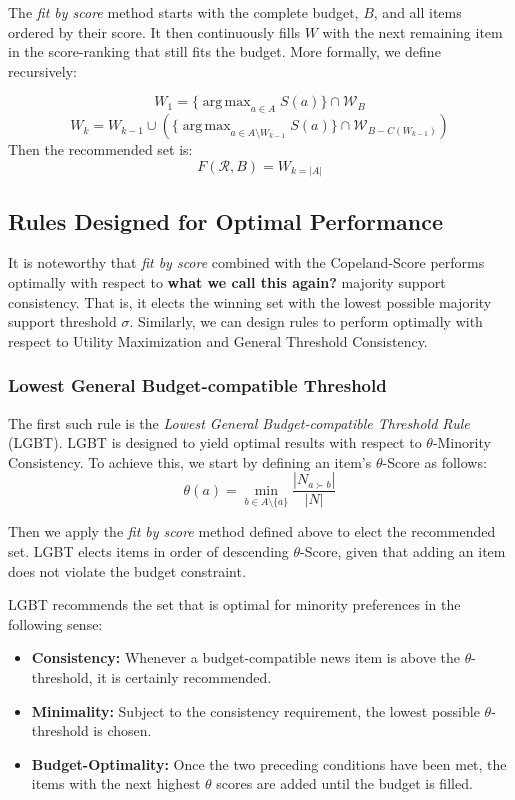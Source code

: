\documentclass{article}
\DeclareMathOperator*{\argmax}{arg\,max}
\begin{document}
The \emph{fit by score} method starts with the complete budget, $B$, and all items ordered by their score. It then continuously fills $W$ with the next remaining item in the score-ranking that still fits the budget. More formally, we define recursively:

\[W_1=\{\argmax_{a\in A}S(a)\}\cap \mathcal{W}_B\]
\[W_k=W_{k-1}\cup (\{\argmax_{a\in A\setminus W_{k-1}}S(a)\}\cap \mathcal{W}_{B-C(W_{k-1})})\]
Then the recommended set is:
\[F(\mathcal{R},B)=W_{k=|A|}\]

\subsection{Rules Designed for Optimal Performance}
It is noteworthy that \emph{fit by score} combined with the Copeland-Score performs optimally with respect to \textbf{what we call this again?} majority support consistency. That is, it elects the winning set with the lowest possible majority support threshold $\sigma$. Similarly, we can design rules to perform optimally with respect to Utility Maximization and General Threshold Consistency.

\subsubsection{Lowest General Budget-compatible Threshold}
The first such rule is the \emph{Lowest General Budget-compatible Threshold Rule} (LGBT). LGBT is designed to yield optimal results with respect to $\theta$-Minority Consistency. To achieve this, we start by defining an item's $\theta$-Score as follows:
\[\theta(a)=\min_{b\in A \setminus {\{a\}}} \frac{|N_{a\succ b}|}{|N|}\]

Then we apply the \emph{fit by score} method defined above to elect the recommended set. LGBT elects items in order of descending $\theta$-Score, given that adding an item does not violate the budget constraint.

LGBT recommends the set that is optimal for minority preferences in the following sense:

\begin{itemize}
\item \textbf{Consistency:} Whenever a budget-compatible news item is above the $\theta$-threshold, it is certainly recommended.
\item \textbf{Minimality:} Subject to the consistency requirement, the lowest possible $\theta$-threshold is chosen.
\item \textbf{Budget-Optimality:} Once the two preceding conditions have been met, the items with the next highest $\theta$ scores are added until the budget is filled.
\end{itemize}
\end{document}
